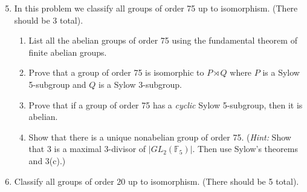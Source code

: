 \documentclass[11pt]{article}
\newcommand{\bF}{\mathbb{F}}
\begin{document}
\begin{enumerate}
  \setcounter{enumi}{4}
  \item{
  In this problem we classify all groups of order 75 up to isomorphism.  (There should be 3 total).
  \begin{enumerate}
    \item{List all the abelian groups of order 75 using the fundamental theorem of finite abelian groups.}
    \item{Prove that a group of order 75 is isomorphic to $P\rtimes Q$ where $P$ is a Sylow 5-subgroup and $Q$ is a Sylow 3-subgroup.}
    \item{Prove that if a group of order 75 has a \textit{cyclic} Sylow 5-subgroup, then it is abelian.}
    \item{Show that there is a unique nonabelian group of order 75.  (\textit{Hint:} Show that 3 is a maximal 3-divisor of $|GL_2(\bF_5)|$.  Then use Sylow's theorems and 3(c).)}
  \end{enumerate}
  }
  \item{
  Classify all groups of order 20 up to isomorphism.  (There should be 5 total).
  }
\end{enumerate}
\end{document}
